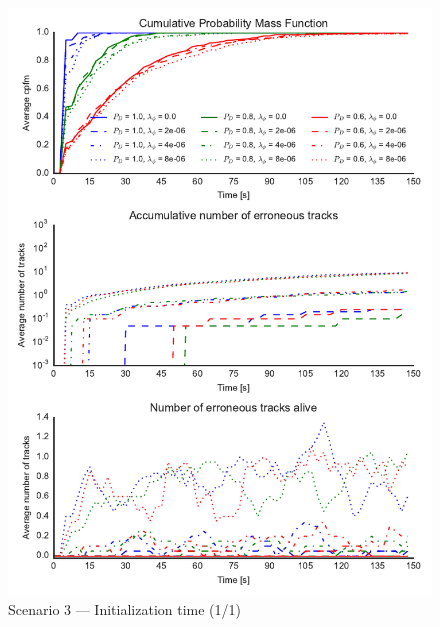 
\begin{figure}
\centering
\includegraphics{Figures/plots/Scenario3_Init-Time(1-1).pdf}
\caption{Scenario 3 --- Initialization time (1/1)}\label{fig:init3_time_1-1}
\end{figure}

